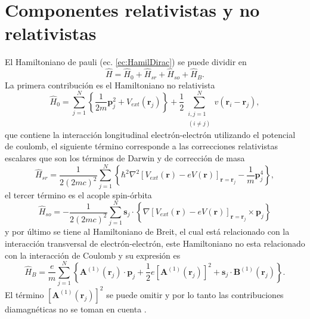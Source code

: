 \section{Componentes relativistas y no relativistas} \label{subsec:rel_norel}
El Hamiltoniano de pauli (ec. \ref{ec:HamilDirac}) se puede dividir en \cite{MB-2015}
\begin{equation}
	\hat{H} = \hat{H}_0 + \hat{H}_{sr} + \hat{H}_{so} + \hat{H}_{B}. \label{ec:divHamDirac}
\end{equation} 
La primera contribuci\'on es el Hamiltoniano  no relativista \cite{MB-2015}
\begin{equation}
	\hat{H}_0 = \sum_{j=1}^{N} \left\{\frac{1}{2m} \pmb{p}_j ^2 + V_{ext} (\pmb{r}_j) \right\} + \frac{1}{2} \sum_{\substack{i,j = 1 \\ (i \not = j)}}^{N} v(\pmb{r}_i -\pmb{r}_j), \label{ec:HamnoRel}
\end{equation} 
que contiene la interacci\'on longitudinal  electr\'on-electr\'on utilizando el potencial de coulomb, el siguiente t\'ermino corresponde a las correcciones relativistas escalares que son los t\'erminos de Darwin y de correcci\'on de masa \cite{MB-2015,Martin-2004}
\begin{equation}
	\hat{H}_{sr} = \frac{1}{2 (2 m c)^2} \sum_{j=1}^{N} \left\{\hbar^2 \nabla^2 [V_{ext} (\pmb{r})-e V(\pmb{r})]_{\pmb{r}= \pmb{r}_j} - \frac{1}{m} \pmb{p}_j ^4 \right\}, \label{ec:HamSR}
\end{equation}
el tercer t\'ermino es el  acople spin-\'orbita \cite{MB-2015,Martin-2004} 
\begin{equation}
	\hat{H}_{so} = -\frac{1}{2 (2 m c)^2} \sum_{j=1}^{N} \pmb{s}_j \cdot \left\{\nabla [V_{ext} (\pmb{r})-e V(\pmb{r})]_{\pmb{r}=\pmb{r}_j} \times \pmb{p}_j \right\} \label{ec:HamSo}
\end{equation}
y por \'ultimo se tiene al Hamiltoniano de Breit, el cual est\'a relacionado con la interacci\'on transversal de electr\'on-electr\'on, este Hamiltoniano no esta relacionado con la interacci\'on de Coulomb y su expresi\'on es \cite{MB-2015, Scott_1980}
\begin{equation}
	\hat{H}_B= \frac{e}{m} \sum_{j=1}^N \left\{\pmb{A}^{(1)} (\pmb{r}_j) \cdot \pmb{p}_j + \frac{1}{2} e \left[\pmb{A}^{(1)} (\pmb{r}_j)\right]^2 + \pmb{s}_j \cdot \pmb{B}^{(1)} (\pmb{r}_j) \right\}. \label{ec:HamBreit}
\end{equation}
El t\'ermino $\left[\pmb{A}^{(1)} (\pmb{r}_j)\right]^2 $ se puede omitir y por lo tanto las contribuciones diamagn\'eticas no se toman en cuenta .
